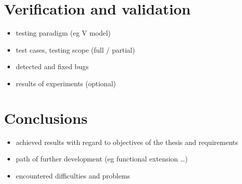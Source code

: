\documentclass[a4paper,twoside,12pt]{book}
\begin{document}
\chapter{Verification and validation}
\begin{itemize}
\item testing paradigm (eg V model)
\item test cases, testing scope (full / partial)
\item detected and fixed bugs
\item results of experiments (optional)
\end{itemize}

 
 

\chapter{Conclusions}
\begin{itemize}
\item achieved results with regard to objectives of the thesis and requirements
\item path of further development (eg functional extension …)
\item encountered difficulties and problems
\end{itemize}
\end{document}
